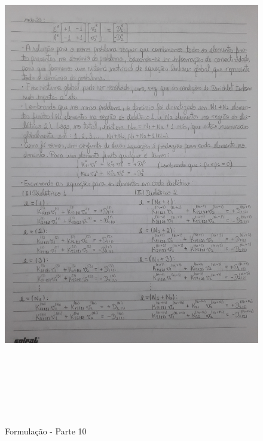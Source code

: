 \documentclass[10pt]{article}
\begin{document}
    \begin{figure}[!htb]
    \centerline{\includegraphics[width=20cm,height=22cm]{Formulação Matemática/Formulacao - Parte 10.jpg}}
    \caption{Formulação - Parte 10}
    \label{fig:fp10}
    \end{figure}
    
\end{document}

